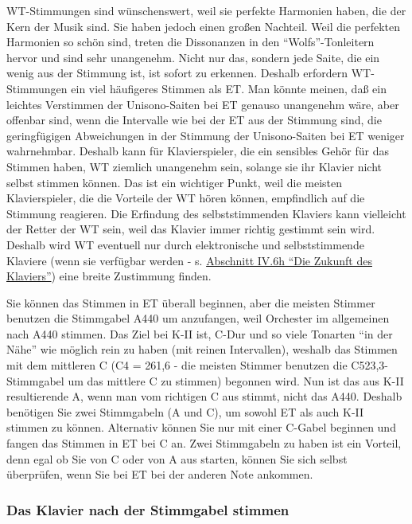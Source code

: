 WT-Stimmungen sind wünschenswert, weil sie perfekte Harmonien haben, die der Kern der Musik sind.
Sie haben jedoch einen großen Nachteil.
Weil die perfekten Harmonien so schön sind, treten die Dissonanzen in den \enquote{Wolfs}-Tonleitern hervor und sind sehr unangenehm.
Nicht nur das, sondern jede Saite, die ein wenig aus der Stimmung ist, ist sofort zu erkennen.
Deshalb erfordern WT-Stimmungen ein viel häufigeres Stimmen als ET.
Man könnte meinen, daß ein leichtes Verstimmen der Unisono-Saiten bei ET genauso unangenehm wäre, aber offenbar sind, wenn die Intervalle wie bei der ET aus der Stimmung sind, die geringfügigen Abweichungen in der Stimmung der Unisono-Saiten bei ET weniger wahrnehmbar.
Deshalb kann für Klavierspieler, die ein sensibles Gehör für das Stimmen haben, WT ziemlich unangenehm sein, solange sie ihr Klavier nicht selbst stimmen können.
Das ist ein wichtiger Punkt, weil die meisten Klavierspieler, die die Vorteile der WT hören können, empfindlich auf die Stimmung reagieren.
Die Erfindung des selbststimmenden Klaviers kann vielleicht der Retter der WT sein, weil das Klavier immer richtig gestimmt sein wird.
Deshalb wird WT eventuell nur durch elektronische und selbststimmende Klaviere (wenn sie verfügbar werden - s. \hyperref[c1iv6h]{Abschnitt IV.6h \enquote{Die Zukunft des Klaviers}}) eine breite Zustimmung finden.

Sie können das Stimmen in ET überall beginnen, aber die meisten Stimmer benutzen die Stimmgabel A440 um anzufangen, weil Orchester im allgemeinen nach A440 stimmen.
Das Ziel bei K-II ist, C-Dur und so viele Tonarten \enquote{in der Nähe} wie möglich rein zu haben (mit reinen Intervallen), weshalb das Stimmen mit dem mittleren C (C4 = 261,6 - die meisten Stimmer benutzen die C523,3-Stimmgabel um das mittlere C zu stimmen) begonnen wird.
Nun ist das aus K-II resultierende A, wenn man vom richtigen C aus stimmt, nicht das A440.
Deshalb benötigen Sie zwei Stimmgabeln (A und C), um sowohl ET als auch K-II stimmen zu können.
Alternativ können Sie nur mit einer C-Gabel beginnen und fangen das Stimmen in ET bei C an.
Zwei Stimmgabeln zu haben ist ein Vorteil, denn egal ob Sie von C oder von A aus starten, können Sie sich selbst überprüfen, wenn Sie bei ET bei der anderen Note ankommen.


\label{c2_6b}
\subsubsection{Das Klavier nach der Stimmgabel stimmen}
\label{c2_6_gabe}

